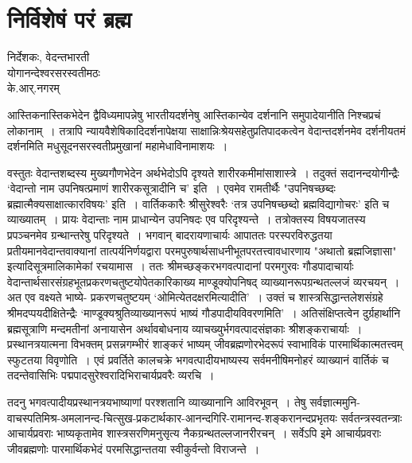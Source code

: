 {\fontsize{15}{17}\selectfont
\chapter{निर्विशेषं परं ब्रह्म}

\begin{center}
\smallskip

निर्देशकः, वेदन्तभारती\\
योगानन्देश्वरसरस्वतीमठः\\
के.आर्.नगरम्
\addrule
\end{center}

आस्तिकनास्तिकभेदेन द्वैविध्यमापन्नेषु भारतीयदर्शनेषु आस्तिकान्येव दर्शनानि समुपादेयानीति निश्चप्रचं लोकानाम्~। तत्रापि न्यायवैशेषिकादिदर्शनापेक्षया साक्षान्निःश्रेयसहेतुप्रतिपादकत्वेन वेदान्तदर्शनमेव दर्शनीयतमं दर्शनमिति मधुसूदनसरस्वतीप्रमुखानां महामेधाविनामाशयः~। 

वस्तुतः वेदान्तशब्दस्य मुख्यगौणभेदेन अर्थभेदोऽपि दृश्यते शारीरकमीमांसाशास्त्रे~। तदुक्तं सदानन्दयोगीन्द्रैः ‘वेदान्तो नाम उपनिषत्प्रमाणं शारीरकसूत्रादीनि च' इति~। एवमेव रामतीर्थैः "उपनिषच्छब्दः ब्रह्मात्मैक्यसाक्षात्कारविषयः' इति~। वार्तिककारैः श्रीसुरेश्वरैः ‘तत्र उपनिषच्छब्दो ब्रह्मविद्यागोचरः' इति च व्याख्यातम्~। प्रायः वेदान्ताः नाम प्राधान्येन उपनिषदः एव परिदृश्यन्ते~। तत्रोक्तस्य विषयजातस्य प्रपञ्चनमेव ग्रन्थान्तरेषु परिदृश्यते~। भगवान् बादरायणाचार्यः आपाततः परस्परविरुद्धतया प्रतीयमानवेदान्तवाक्यानां तात्पर्यनिर्णयद्वारा परमपुरुषार्थसाधनीभूतपरतत्त्वावधारणाय "अथातो ब्रह्मजिज्ञासा" इत्यादिसूत्रमालिकामेकां  रचयामास~। ततः श्रीमच्छङ्करभगवत्पादानां परमगुरवः गौडपादाचार्याः वेदान्तार्थसारसंग्रहभूतप्रकरणचतुष्टयोपेतकारिकाख्य माण्डूक्योपनिषद् व्याख्यानरूपग्रन्थतल्लजं व्यरचयन्~। अत एव वक्ष्यते भाष्ये- प्रकरणचतुष्टयम् ‘ओमित्येतदक्षरमित्यादीति'~। उक्तं च शास्त्रसिद्धान्तलेशसंग्रहे श्रीमदप्पयदीक्षितेन्द्रैः ‘माण्डूक्यश्रुतिव्याख्यानरूपं भाष्यं गौडपादीयविवरणमिति'~। अतिसंक्षिप्तत्वेन दुर्ग्रहार्थानि ब्रह्मसूत्राणि मन्दमतीनां अनायासेन अर्थावबोधनाय व्याचख्युर्भगवत्पादसंज्ञकाः श्रीशङ्कराचार्याः~। प्रस्थानत्रयात्मना विभक्तम् प्रसन्नगम्भीरं शाङ्करं भाष्यम् जीवब्रह्मणोरभेदरूपं स्वाभाविकं पारमार्थिकात्मतत्त्वम् स्फुटतया विवृणोति~। एवं प्रवर्तिते कालचक्रे भगवत्पादीयभाष्यस्य सर्वमनीषिमनोहरं व्याख्यानं वार्तिकं च तदन्तेवासिभिः पद्मपादसुरेश्वरादिभिराचार्यप्रवरैः व्यरचि~। 

तदनु भगवत्पादीयप्रस्थानत्रयभाष्याणां परश्शतानि व्याख्यानानि आविरभूवन्~। तेषु सर्व\-ज्ञात्ममुनि-वाचस्पतिमिश्र-अमलानन्द-चित्सुख-प्रकटार्थकार-आनन्दगिरि-रामानन्द-\break शङ्करानन्दप्रभृतयः सर्वतन्त्रस्वतन्त्राः आचार्यप्रवराः भाष्यकृतामेव शास्त्रसरणिमनुसृत्य नैकग्रन्थतल्लजानरीरचन्~। सर्वेऽपि इमे आचार्यप्रवराः जीवब्रह्मणोः पारमार्थिकभेदं परमसिद्धान्ततया स्वीकुर्वन्तो विराजन्ते~। 

}

